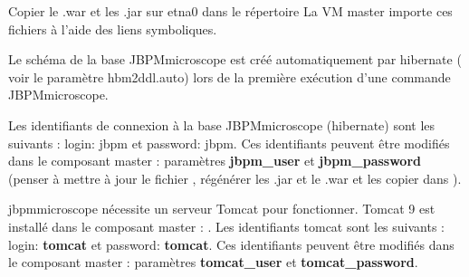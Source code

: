 Copier le .war et les .jar sur etna0 dans le répertoire 
La VM master importe ces fichiers à l’aide des liens symboliques.
\newline

Le schéma de la base JBPMmicroscope est créé automatiquement par hibernate ( voir le paramètre hbm2ddl.auto) lors de la première exécution d'une commande JBPMmicroscope.
\newline

Les identifiants de connexion à la base JBPMmicroscope (hibernate) sont les suivants :
login: jbpm et password: jbpm. Ces identifiants peuvent être modifiés dans le composant master : paramètres \textbf{jbpm\_user} et \textbf{jbpm\_password} (penser à mettre à jour le fichier , régénérer les .jar et le .war et les copier dans ).
\newline

jbpmmicroscope nécessite un serveur Tomcat pour fonctionner. Tomcat 9 est installé dans le composant master : . Les identifiants tomcat sont les suivants : login: \textbf{tomcat} et password: \textbf{tomcat}.
Ces identifiants peuvent être modifiés dans le composant master : paramètres \textbf{tomcat\_user} et \textbf{tomcat\_password}.
